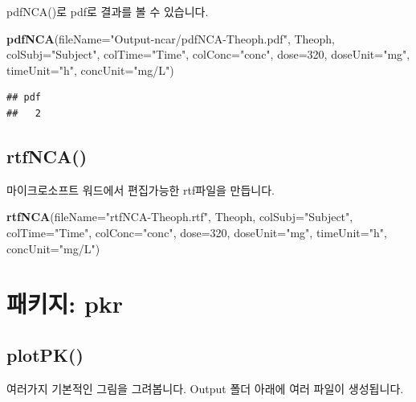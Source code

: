 \documentclass[9pt,]{krantz}
\newenvironment{Shaded}{\begin{snugshade}}{\end{snugshade}}
\newcommand{\KeywordTok}[1]{\textcolor[rgb]{0.13,0.29,0.53}{\textbf{#1}}}
\newcommand{\DataTypeTok}[1]{\textcolor[rgb]{0.13,0.29,0.53}{#1}}
\newcommand{\DecValTok}[1]{\textcolor[rgb]{0.00,0.00,0.81}{#1}}
\newcommand{\StringTok}[1]{\textcolor[rgb]{0.31,0.60,0.02}{#1}}
\newcommand{\NormalTok}[1]{#1}
\begin{document}
pdfNCA()로 pdf로 결과를 볼 수 있습니다.

\begin{Shaded}
\begin{Highlighting}[]
\KeywordTok{pdfNCA}\NormalTok{(}\DataTypeTok{fileName=}\StringTok{"Output-ncar/pdfNCA-Theoph.pdf"}\NormalTok{, Theoph, }\DataTypeTok{colSubj=}\StringTok{"Subject"}\NormalTok{, }\DataTypeTok{colTime=}\StringTok{"Time"}\NormalTok{, }
       \DataTypeTok{colConc=}\StringTok{"conc"}\NormalTok{, }\DataTypeTok{dose=}\DecValTok{320}\NormalTok{, }\DataTypeTok{doseUnit=}\StringTok{"mg"}\NormalTok{, }\DataTypeTok{timeUnit=}\StringTok{"h"}\NormalTok{, }\DataTypeTok{concUnit=}\StringTok{"mg/L"}\NormalTok{)}
\end{Highlighting}
\end{Shaded}

\begin{verbatim}
## pdf 
##   2
\end{verbatim}

\section{rtfNCA()}\label{rtfnca}

마이크로소프트 워드에서 편집가능한 rtf파일을 만듭니다.

\begin{Shaded}
\begin{Highlighting}[]
\KeywordTok{rtfNCA}\NormalTok{(}\DataTypeTok{fileName=}\StringTok{"rtfNCA-Theoph.rtf"}\NormalTok{, Theoph, }\DataTypeTok{colSubj=}\StringTok{"Subject"}\NormalTok{, }\DataTypeTok{colTime=}\StringTok{"Time"}\NormalTok{, }
       \DataTypeTok{colConc=}\StringTok{"conc"}\NormalTok{, }\DataTypeTok{dose=}\DecValTok{320}\NormalTok{, }\DataTypeTok{doseUnit=}\StringTok{"mg"}\NormalTok{, }\DataTypeTok{timeUnit=}\StringTok{"h"}\NormalTok{, }\DataTypeTok{concUnit=}\StringTok{"mg/L"}\NormalTok{)}
\end{Highlighting}
\end{Shaded}

\chapter{패키지: pkr}\label{-pkr}

\section{plotPK()}\label{plotpk}

여러가지 기본적인 그림을 그려봅니다. Output 폴더 아래에 여러 파일이
생성됩니다.
\end{document}
